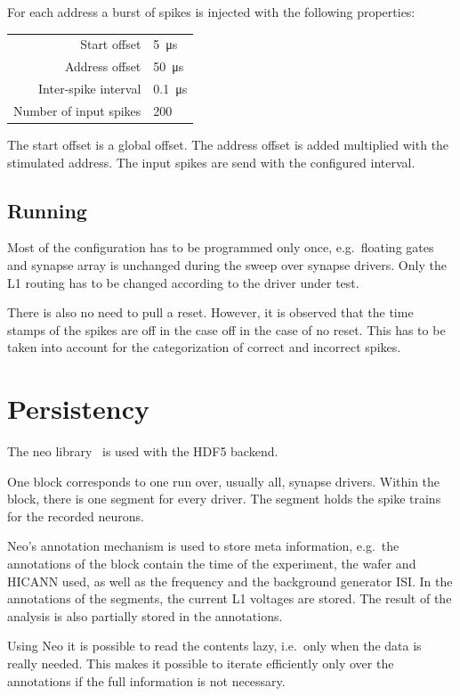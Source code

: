 \documentclass[a4paper]{article}
\begin{document}
For each address a burst of spikes is injected with the following
properties:

\begin{tabular}{rl}
  Start offset & \SI{5}{\micro\second}\\
  Address offset & \SI{50}{\micro\second}\\
  Inter-spike interval & \SI{0.1}{\micro\second}\\
  Number of input spikes & 200
\end{tabular}

The start offset is a global offset. The address offset is added
multiplied with the stimulated address. The input spikes are send
with the configured interval.

\subsection{Running}
\label{sec:running}

Most of the configuration has to be programmed only once, e.g.\
floating gates and synapse array is unchanged during the sweep over
synapse drivers. Only the L1 routing has to be changed according to
the driver under test.

There is also no need to pull a reset. However, it is observed that
the time stamps of the spikes are off in the case off in the case of
no reset. This has to be taken into account for the categorization of
correct and incorrect spikes.

\section{Persistency}

The neo library~\cite{neo} is used with the HDF5 backend.

One block corresponds to one run over, usually all, synapse
drivers. Within the block, there is one segment for every driver. The
segment holds the spike trains for the recorded neurons.

Neo's annotation mechanism is used to store meta information, e.g.\
the annotations of the block contain the time of the experiment, the
wafer and HICANN used, as well as the frequency and the background
generator ISI\@. In the annotations of the segments, the current L1
voltages are stored. The result of the analysis is also partially
stored in the annotations.

Using Neo it is possible to read the contents lazy, i.e.\ only when
the data is really needed. This makes it possible to iterate
efficiently only over the annotations if the full information is not
necessary.
\end{document}
